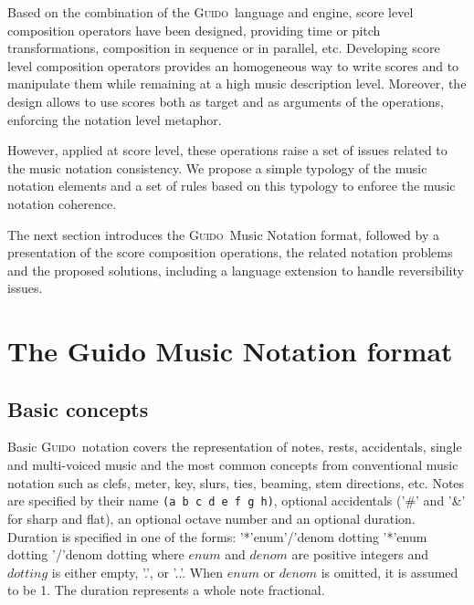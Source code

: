 \documentclass[twoside,10pt,a4paper]{article}
\newenvironment{gmncode}		{\vspace{-2mm}\small\verbatim}{\endverbatim\vspace{-2mm}}
\newcommand{\Guido}		{\textsc{Guido}}
\newcommand{\code}[1]		{{\small \texttt{#1}}}
\begin{document}
Based on the combination of the \Guido\ language and engine, score level composition operators have been designed, providing time or pitch transformations, composition in sequence or in parallel, etc.
Developing score level composition operators provides an homogeneous way to write scores and to manipulate them while remaining at a high music description level. Moreover, the design allows to use scores both as target and as arguments of the operations, enforcing the notation level metaphor.

However, applied at score level, these operations raise a set of issues related to the music notation consistency. We propose a simple typology of the music notation elements and a set of rules based on this typology to enforce the music notation coherence.

The next section introduces the \Guido\ Music Notation format, followed by a presentation of the score composition operations, the related notation problems and the proposed solutions, including a language extension to handle reversibility issues.

\section{The Guido Music Notation format}

\subsection{Basic concepts}
Basic \Guido\ notation covers the representation of notes, rests, accidentals, single and multi-voiced music and the most common concepts from conventional music notation such as clefs, meter, key, slurs, ties, beaming, stem directions, etc.
Notes are specified by their name \code{(a b c d e f g h)}, optional accidentals ('\#' and '\&' for sharp and flat), an optional octave number and an optional duration. \\
Duration is specified in one of the forms: 
\begin{gmncode} 
   '*'enum'/'denom dotting
   '*'enum dotting 
   '/'denom dotting
\end{gmncode} 
\noindent where $enum$ and $denom$ are positive integers and $dotting$ is either empty, '.', or '..'. When $enum$ or $denom$ is omitted, it is assumed to be 1. The duration represents a whole note fractional.
\end{document}
